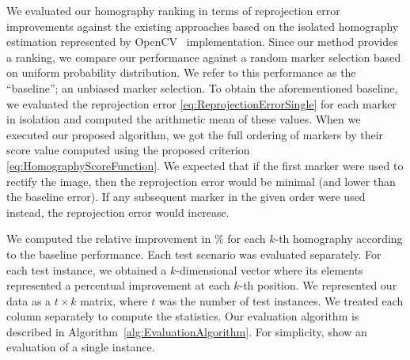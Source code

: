 We evaluated our homography ranking in terms of reprojection error improvements against the existing approaches based on the isolated homography estimation represented by OpenCV~\cite{bradski2008learning} implementation. Since our method provides a ranking, we compare our performance against a random marker selection based on uniform probability distribution. We refer to this performance as the ``baseline''; an unbiased marker selection. To obtain the aforementioned baseline, we evaluated the reprojection error \eqref{eq:ReprojectionErrorSingle} for each marker in isolation and computed the arithmetic mean of these values. When we executed our proposed algorithm, we got the full ordering of markers by their score value computed using the proposed criterion \eqref{eq:HomographyScoreFunction}. We expected that if the first marker were used to rectify the image, then the reprojection error would be minimal (and lower than the baseline error). If any subsequent marker in the given order were used instead, the reprojection error would increase.

We computed the relative improvement in \% for each $k$-th homography according to the baseline performance. Each test scenario was evaluated separately. For each test instance, we obtained a $k$-dimensional vector where its elements represented a percentual improvement at each $k$-th position. We represented our data as a $t \times k$ matrix, where $t$ was the number of test instances. We treated each column separately to compute the statistics. Our evaluation algorithm is described in Algorithm~\ref{alg:EvaluationAlgorithm}. For simplicity, show an evaluation of a single instance.

\def\meanerrs{\boldsymbol{e}}
\def\errdiffs{\boldsymbol{p}}
\def\arracc{\left[ \right]}


